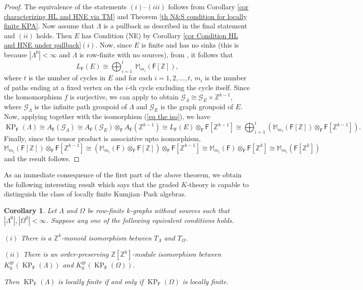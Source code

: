 \documentclass[a4paper,reqno,12pt]{amsart}
\numberwithin{equation}{section}
\newtheorem{cor}[thm]{Corollary}
\theoremstyle{definition}
\theoremstyle{remark}
\newcommand{\gr}{\operatorname{gr}}
\newcommand{\KP}{\operatorname{KP}}
\begin{document}
\begin{proof}
The equivalence of the statements $(i)$--$(iii)$ follows from Corollary \ref{cor characterizing HL and HNE via TM} and Theorem \ref{th N&S condition for locally finite KPA}. Now assume that $\Lambda$ is a pullback as described in the final statement and $(ii)$ holds. Then $E$ has Condition (NE) by Corollary \ref{cor Condition HL and HNE under pullback}$(i)$. Now, since $E$ is finite and has no sinks (this is because $|\Lambda^0|<\infty$ and $\Lambda$ is row-finite with no sources), from \cite[Theorems 1.8 \& 3.8]{AAS}, it follows that 
\begin{equation}\label{eq the iso}
L_\mathsf{F}(E)\cong \displaystyle{\bigoplus_{i=1}^{t}}~\mathbb{M}_{m_i}(\mathsf{F}[\mathbb{Z}]),    
\end{equation}
where $t$ is the number of cycles in $E$ and for each $i=1,2,\ldots,t$, $m_i$ is the number of paths ending at a fixed vertex on the $i$-th cycle excluding the cycle itself. Since the homomorphism $f$ is surjective, we can apply \cite[Proposition 2.10]{KumjianPask} to obtain $\mathcal{G}_{\Lambda}\cong \mathcal{G}_{E}\times \mathbb{Z}^{k-1}$, where $\mathcal{G}_\Lambda$ is the infinite path groupoid of $\Lambda$ and $\mathcal{G}_E$ is the graph groupoid of $E$. Now, applying \cite[Theorem 4.3]{Rigby} together with the isomorphism (\ref{eq the iso}), we have \[\KP_\mathsf{F}(\Lambda)\cong A_\mathsf{F}(\mathcal{G}_\Lambda)\cong A_\mathsf{F}(\mathcal{G}_E)\otimes_\mathsf{F} A_\mathsf{F}(\mathbb{Z}^{k-1})\cong L_\mathsf{F}(E)\otimes_\mathsf{F} \mathsf{F}[\mathbb{Z}^{k-1}]\cong \displaystyle{\bigoplus_{i=1}^{t}}\left(\mathbb{M}_{m_i}(\mathsf{F}[\mathbb{Z}])\otimes_\mathsf{F} \mathsf{F}[\mathbb{Z}^{k-1}]\right).\] Finally, since the tensor product is associative upto isomorphism, \[\mathbb{M}_{m_i}(\mathsf{F}[\mathbb{Z}])\otimes_\mathsf{F} \mathsf{F}[\mathbb{Z}^{k-1}]\cong (\mathbb{M}_{m_i}(\mathsf{F})\otimes_\mathsf{F} \mathsf{F}[\mathbb{Z}])\otimes_\mathsf{F} \mathsf{F}[\mathbb{Z}^{k-1}]\cong \mathbb{M}_{m_i}(\mathsf{F})\otimes_\mathsf{F} \mathsf{F}[\mathbb{Z}^k]\cong \mathbb{M}_{m_i}(\mathsf{F}[\mathbb{Z}^k])\] and the result follows. 
\end{proof}
As an immediate consequence of the first part of the above theorem, we obtain the following interesting result which says that the graded $K$-theory is capable to distinguish the class of locally finite Kumjian--Pask algebras.
\begin{cor}\label{cor distinguishing locally finite KPAs}
Let $\Lambda$ and $\Omega$ be row-finite $k$-graphs without sources such that $|\Lambda^0|, |\Omega^0|<\infty$. Suppose any one of the following equivalent conditions holds.

$(i)$ There is a $\mathbb{Z}^k$-monoid isomorphism between $T_\Lambda$ and $T_\Omega$.

$(ii)$ There is an order-preserving $\mathbb{Z}[\mathbb{Z}^k]$-module isomorphism between $K_0^{\gr}(\KP_\mathsf{F}(\Lambda))$ and $K_0^{\gr}(\KP_\mathsf{F}(\Omega))$.

Then $\KP_\mathsf{F}(\Lambda)$ is locally finite if and only if $\KP_\mathsf{F}(\Omega)$ is locally finite.
\end{cor}
\end{document}
